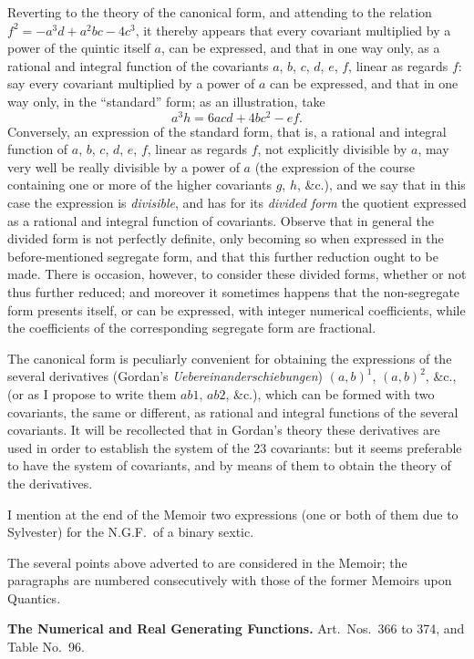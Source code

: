 \documentclass[12pt,a4paper]{article}
\begin{document}
Reverting to the theory of the canonical form, and attending to the relation $f^2 = -a^3 d + a^2 bc - 4c^3$, it thereby appears that every covariant multiplied by a power of the quintic itself $a$, can be expressed, and that in one way only, as a rational and integral function of the covariants $a$, $b$, $c$, $d$, $e$, $f$, linear as regards $f$: say every covariant multiplied by a power of $a$ can be expressed, and that in one way only, in the ``standard'' form; as an illustration, take
\[
a^3 h = 6acd + 4bc^2 - ef.
\]
Conversely, an expression of the standard form, that is, a rational and integral function of $a$, $b$, $c$, $d$, $e$, $f$, linear as regards $f$, not explicitly divisible by $a$, may very well be really divisible by a power of $a$ (the expression of the course containing one or more of the higher covariants $g$, $h$, \&c.), and we say that in this case the expression is \textit{divisible}, and has for its \textit{divided form} the quotient expressed as a rational and integral function of covariants. Observe that in general the divided form is not perfectly definite, only becoming so when expressed in the before-mentioned segregate form, and that this further reduction ought to be made. There is occasion, however, to consider these divided forms, whether or not thus further reduced; and moreover it sometimes happens that the non-segregate form presents itself, or can be expressed, with integer numerical coefficients, while the coefficients of the corresponding segregate form are fractional.

The canonical form is peculiarly convenient for obtaining the expressions of the several derivatives (Gordan's \textit{Uebereinanderschiebungen}) $(a, b)^1$, $(a, b)^2$, \&c., (or as I propose to write them $ab1$, $ab2$, \&c.), which can be formed with two covariants, the same or different, as rational and integral functions of the several covariants. It will be recollected that in Gordan's theory these derivatives are used in order to establish the system of the 23 covariants: but it seems preferable to have the system of covariants, and by means of them to obtain the theory of the derivatives.

I mention at the end of the Memoir two expressions (one or both of them due to Sylvester) for the N.G.F.\ of a binary sextic.

The several points above adverted to are considered in the Memoir; the paragraphs are numbered consecutively with those of the former Memoirs upon Quantics.

\bigskip
\noindent\textbf{The Numerical and Real Generating Functions.} Art.\ Nos.\ 366 to 374, and Table No.~96.
\end{document}
